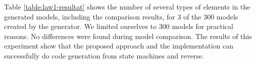  

Table \ref{table:law1-resultat} shows the number of several types of elements in the generated models, including the comparison results, for 3 of the 300 models created by the generator. We limited ourselves to 300 models for practical reasons. No differences were found during model comparison. The results of this experiment show that the proposed approach and the implementation can successfully do code generation from state machines and reverse. 

%

%

%


%